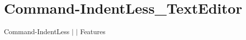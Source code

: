 \chapter{Command-\/\+Indent\+Less\+\_\+\+Text\+Editor }
\hypertarget{md__docs_2_text_editor_2_features_2_command-_indent_less___text_editor}{}\label{md__docs_2_text_editor_2_features_2_command-_indent_less___text_editor}
Command-\/\+Indent\+Less \texorpdfstring{$\vert$}{|}  \texorpdfstring{$\vert$}{|} Features



 